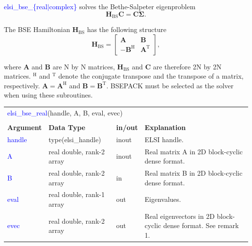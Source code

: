 \documentclass{report}
\newcommand{\tcb}[1]{\textcolor{blue}{#1}}
\begin{document}
\tcb{elsi\_bse\_\{real$\vert$complex\}} solves the Bethe-Salpeter eigenproblem
\begin{equation}
\boldsymbol{H}_\text{BS} \boldsymbol{C} = \boldsymbol{C} \boldsymbol{\Sigma}.
\end{equation}

The BSE Hamiltonian $\boldsymbol{H}_\text{BS}$ has the following structure
\begin{equation}
\boldsymbol{H}_\text{BS} =
\begin{bmatrix}
\boldsymbol{A} & \boldsymbol{B}\\
-\boldsymbol{B}^\text{H} & \boldsymbol{A}^\text{T}
\end{bmatrix},
\end{equation}

where $\boldsymbol{A}$ and $\boldsymbol{B}$ are N by N matrices, $\boldsymbol{H}_\text{BS}$ and $\boldsymbol{C}$ are therefore 2N by 2N matrices. $^\text{H}$ and $^\text{T}$ denote the conjugate transpose and the transpose of a matrix, respectively. $\boldsymbol{A} = \boldsymbol{A}^\text{H}$ and $\boldsymbol{B} = \boldsymbol{B}^\text{T}$. BSEPACK must be selected as the solver when using these subroutines.

\begin{tabular}[]{|p{20mm}|p{45mm}|p{15mm}|p{85mm}|}
\multicolumn{4}{l}{\tcb{elsi\_bse\_real}(handle, A, B, eval, evec)}\\
\multicolumn{4}{l}{}\\
\hline
\multicolumn{1}{|l|}{\textbf{Argument}} & \multicolumn{1}{l|}{\textbf{Data Type}} & \multicolumn{1}{l|}{\textbf{in/out}} & \multicolumn{1}{l|}{\textbf{Explanation}}\\
\hline
\tcb{handle} & type(elsi\_handle)        & inout & ELSI handle.\\
\hline
\tcb{A}      & real double, rank-2 array & inout & Real matrix A in 2D block-cyclic dense format.\\
\hline
\tcb{B}      & real double, rank-2 array & in    & Real matrix B in 2D block-cyclic dense format.\\
\hline
\tcb{eval}   & real double, rank-1 array & out   & Eigenvalues.\\
\hline
\tcb{evec}   & real double, rank-2 array & out   & Real eigenvectors in 2D block-cyclic dense format. See remark 1.\\
\hline
\end{tabular}
\end{document}
